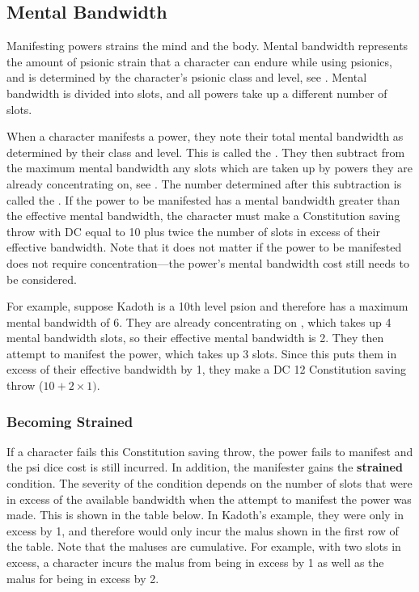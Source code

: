 \subsection{Mental Bandwidth}
Manifesting powers strains the mind and the body.
Mental bandwidth represents the amount of psionic strain that
a character can endure while using psionics,
and is determined by the character's psionic class and level,
see .
Mental bandwidth is divided into slots,
and all powers take up a different number of slots.

When a character manifests a power,
they note their total mental bandwidth
as determined by their class and level.
This is called the
.
They then subtract from the maximum mental bandwidth
any slots which are taken up by powers they are already concentrating on,
see .
The number determined after this subtraction is called the
.
If the power to be manifested has a mental bandwidth
greater than the effective mental bandwidth,
the character must make a Constitution saving throw with
DC equal to 10 plus twice the number of slots
in excess of their effective bandwidth.
Note that it does not matter if the power to be manifested
does not require concentration---the power's mental bandwidth cost
still needs to be considered.

For example,
suppose Kadoth is a 10th level psion
and therefore has a maximum mental bandwidth of 6.
They are already concentrating on ,
which takes up 4 mental bandwidth slots,
so their effective mental bandwidth is 2.
They then attempt to manifest the  power,
which takes up 3 slots.
Since this puts them in excess of their effective bandwidth by 1,
they make a DC 12 Constitution saving throw ($10 + 2 \times 1)$.

\subsubsection{Becoming Strained}
If a character fails this Constitution saving throw,
the power fails to manifest
and the psi dice cost is still incurred.
In addition, the manifester gains the \textbf{strained} condition.
The severity of the condition depends on the number of slots
that were in excess of the available bandwidth when the attempt
to manifest the power was made.
This is shown in the table below.
In Kadoth's example,
they were only in excess by 1,
and therefore would only incur the malus shown in the
first row of the table.
Note that the maluses are cumulative.
For example,
with two slots in excess,
a character incurs the malus from being in excess by 1
as well as the malus for being in excess by 2.


